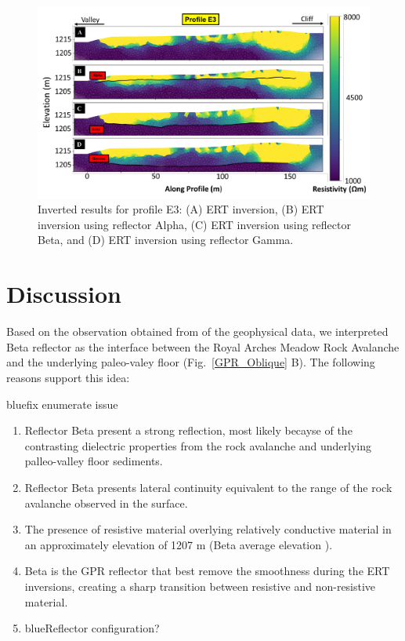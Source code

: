 \documentclass[5p]{elsarticle}
\newcommand{\COMON}{\begin{color}{blue}}
\newcommand{\COMOFF}{\end{color}}
\begin{document}
							 \begin{figure}[h]

	\includegraphics[width=\textwidth]{Figures/ERT_inversion.pdf}
		\caption{Inverted results for profile E3: (A) ERT inversion, (B) ERT inversion using reflector Alpha, (C) ERT inversion using reflector Beta, and (D) ERT inversion using reflector Gamma.\label{ERT_inversion}}

								   \end{figure}

\bigskip


\section{Discussion}

Based on the observation obtained from of the geophysical data, we interpreted Beta reflector as the interface between the Royal Arches Meadow Rock Avalanche and the underlying paleo-valey floor (Fig.~\ref{GPR_Oblique} B). The following reasons support this idea: 

\COMON fix enumerate issue \COMOFF

\begin{enumerate}[I]
\item Reflector Beta present a strong reflection, most likely becayse of the contrasting dielectric properties from the rock avalanche and underlying palleo-valley floor sediments. 
\item Reflector Beta presents lateral continuity equivalent to the range of the rock avalanche observed in the surface.  
\item The presence of resistive material overlying relatively conductive material in an approximately elevation of 1207 m (Beta average elevation ). 
\item Beta is the GPR reflector that best remove the smoothness during the ERT inversions, creating a sharp transition between resistive and non-resistive material.
\item  \COMON Reflector configuration? \COMOFF 
\end{enumerate}
\end{document}
